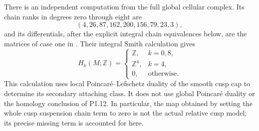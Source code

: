 \begin{theorem}\label{night:P1.19}
There is an independent computation from the full global cellular
complex.  Its chain ranks in degrees zero through eight are
\[
 (4,26,87,162,200,156,79,23,3),
\]
and its differentials, after the explicit integral chain equivalences
below, are the matrices of case one in
.
Their integral Smith calculation gives
\[
 H_k(M;\mathbb Z)=
 \begin{cases}
 \mathbb Z,&k=0,8,\\
 \mathbb Z^4,&k=4,\\
 0,&\text{otherwise}.
 \end{cases}
\]
This calculation uses local Poincar\'e--Lefschetz duality of the
smooth cusp cap to determine its secondary attaching class.  It does
not use global Poincar\'e duality or the homology conclusion of P1.12.
In particular, the map obtained by setting the whole cusp suspension
chain term to zero is not the actual relative cusp model; its precise
missing term is accounted for here.
\end{theorem}
